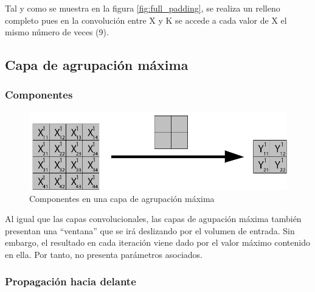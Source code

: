 Tal y como se muestra en la figura \ref{fig:full_padding}, se realiza un relleno completo pues en la convolución entre X y K se accede a cada valor de X el mismo número de veces (9).

\subsection{Capa de agrupación máxima}

\subsubsection{Componentes}

\begin{figure}[H]
	\centering
	\includegraphics[scale=0.35]{imagenes/pool_nombres.jpg}  
	\caption{Componentes en una capa de agrupación máxima}
\end{figure}

Al igual que las capas convolucionales, las capas de agupación máxima también presentan una ``ventana'' que se irá deslizando por el volumen de entrada. Sin embargo, el resultado en cada iteración viene dado por el valor máximo contenido en ella. Por tanto, no presenta parámetros asociados.

\subsubsection{Propagación hacia delante}

